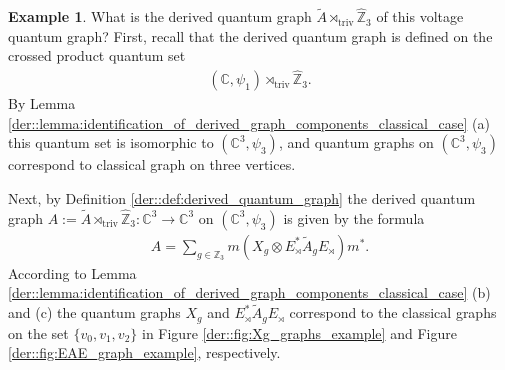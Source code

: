 \documentclass{amsart}
\newcommand{\C}{\mathbb{C}}
\newcommand{\Z}{\mathbb{Z}}
\theoremstyle{definition}
\newtheorem{example}[thm]{Example}
\theoremstyle{definition}
\begin{document}
\begin{example}
    What is the derived quantum graph $\tilde{A} \rtimes_{\mathrm{triv}} \hat{\Z}_3$ of this voltage quantum graph? First, recall that the derived quantum graph is defined on the crossed product quantum set
    \begin{align*}
        (\C, \psi_1) \rtimes_{\mathrm{triv}} \hat{\Z}_3.
    \end{align*}
    By Lemma \ref{der::lemma:identification_of_derived_graph_components_classical_case} (a) this quantum set is isomorphic to $(\C^3, \psi_3)$, and quantum graphs on $(\C^3, \psi_3)$ correspond to classical graph on three vertices.

    Next, by Definition \ref{der::def:derived_quantum_graph} the derived quantum graph $A := \tilde{A} \rtimes_{\mathrm{triv}} \hat{\Z}_3: \C^3 \to \C^3$ on $(\C^3, \psi_3)$ is given by the formula
    \begin{align*}
        A = \sum_{g \in \Z_3} m(X_g \otimes E_\rtimes^\ast \tilde{A}_g E_\rtimes) m^\ast.
    \end{align*}
    According to Lemma \ref{der::lemma:identification_of_derived_graph_components_classical_case} (b) and (c) the quantum graphs $X_g$ and $E_\rtimes^\ast \tilde{A}_g E_\rtimes$ correspond to the classical graphs on the set $\{v_0, v_1, v_2\}$ in Figure \ref{der::fig:Xg_graphs_example} and Figure \ref{der::fig:EAE_graph_example}, respectively.
    \begin{figure}[bt]
\end{figure}
\end{example}
\end{document}
